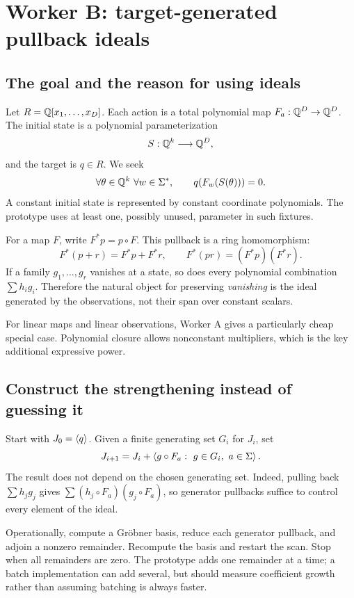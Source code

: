 \section{Worker B: target-generated pullback ideals}
\label{sec:ideal}

\subsection{The goal and the reason for using ideals}

Let $R=\mathbb Q[x_1,\ldots,x_D]$. Each action is a total polynomial map
$F_a:\mathbb Q^D\to\mathbb Q^D$. The initial state is a polynomial parameterization
\[
 S:\mathbb Q^k\longrightarrow\mathbb Q^D,
\]
and the target is $q\in R$. We seek
\begin{equation}\label{eq:poly-goal}
 \forall\theta\in\mathbb Q^k\ \forall w\in\Sigma^*,\qquad
 q(F_w(S(\theta)))=0.
\end{equation}
A constant initial state is represented by constant coordinate polynomials.
The prototype uses at least one, possibly unused, parameter in such fixtures.

For a map $F$, write $F^*p=p\circ F$. This pullback is a ring homomorphism:
\[
 F^*(p+r)=F^*p+F^*r,\qquad F^*(pr)=(F^*p)(F^*r).
\]
If a family $g_1,\ldots,g_r$ vanishes at a state, so does every polynomial
combination $\sum h_i g_i$. Therefore the natural object for preserving
\emph{vanishing} is the ideal generated by the observations, not their span over
constant scalars.

For linear maps and linear observations, Worker A gives a particularly cheap
special case. Polynomial closure allows nonconstant multipliers, which is the
key additional expressive power.

\subsection{Construct the strengthening instead of guessing it}

Start with $J_0=\left\langle q\right\rangle$. Given a finite generating set $G_i$ for $J_i$, set
\begin{equation}\label{eq:ideal-chain}
 J_{i+1}=J_i+
 \left\langle g\circ F_a:\ g\in G_i,\ a\in\Sigma\right\rangle.
\end{equation}
The result does not depend on the chosen generating set. Indeed, pulling back
$\sum h_jg_j$ gives $\sum (h_j\circ F_a)(g_j\circ F_a)$, so generator
pullbacks suffice to control every element of the ideal.

Operationally, compute a Gr\"obner basis, reduce each generator pullback, and
adjoin a nonzero remainder. Recompute the basis and restart the scan. Stop when
all remainders are zero. The prototype adds one remainder at a time; a batch
implementation can add several, but should measure coefficient growth rather
than assuming batching is always faster.

